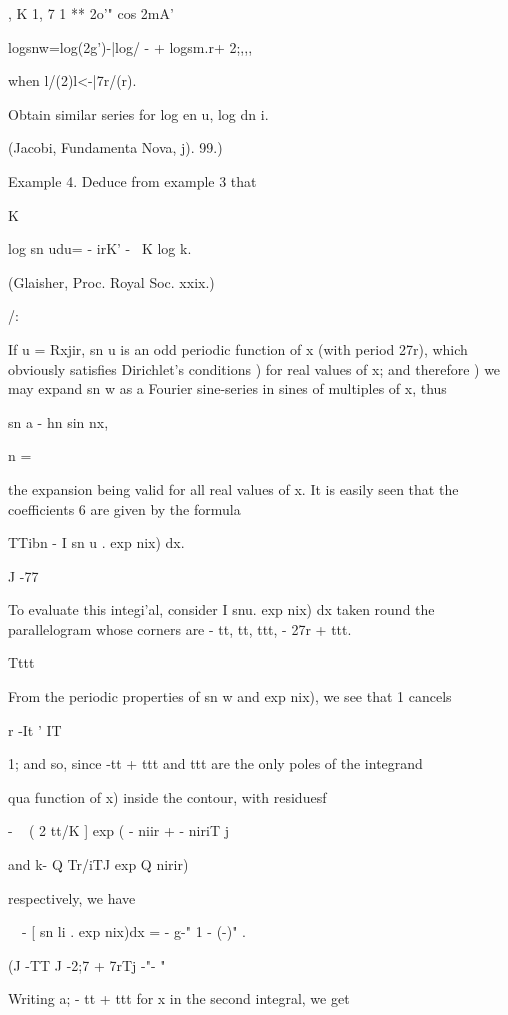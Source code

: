 , K 1, 7 1  ** 2o'" cos 2mA'

logsnw=log(2g')-|log/ - + logsm.r+ 2;,,,

when l/(2)l<-|7r/(r).

Obtain similar series for log en u, log dn i.

(Jacobi, Fundamenta Nova, j). 99.)

Example 4. Deduce from example 3 that

 K

log sn udu= - irK' - \ K log k.

(Glaisher, Proc. Royal Soc. xxix.)

/:

%
%


If u = Rxjir, sn u is an odd periodic function of x (with period 27r),
which obviously satisfies Dirichlet's conditions ) for real
values of x; and therefore ) we may expand sn w as a Fourier
sine-series in sines of multiples of x, thus

sn a - hn sin nx,

n = \

the expansion being valid for all real values of x. It is easily seen
that the coefficients 6 are given by the formula

TTibn - I sn u . exp nix) dx.

J -77

To evaluate this integi'al, consider I snu. exp nix) dx taken round
the parallelogram whose corners are - tt, tt, ttt, - 27r + ttt.

Tttt

From the periodic properties of sn w and exp nix), we see that 1
cancels

r -It ' IT

1; and so, since -tt + ttt and ttt are the only poles of the
integrand

 qua function of x) inside the contour, with residuesf

- ~ ( 2 tt/K ] exp ( - niir + - niriT j

and k- Q Tr/iTJ exp Q nirir)

respectively, we have

\ \ - [ sn li . exp nix)dx = - g-" 1 - (-)" .

(J -TT J -2;7 + 7rTj -"- "

Writing a; - tt + ttt for x in the second integral, we get

